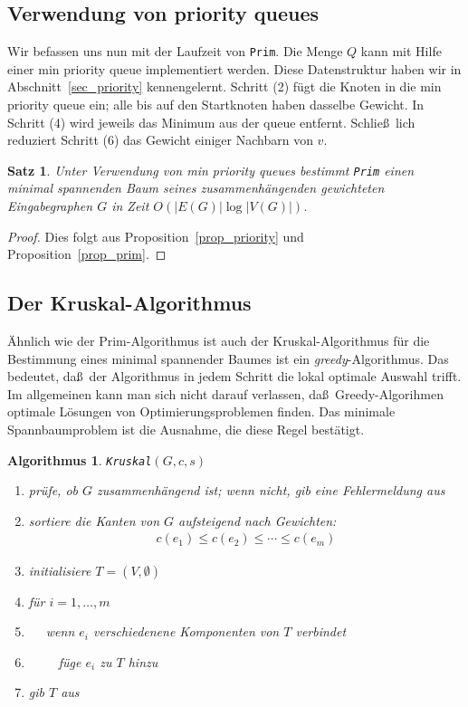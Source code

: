 \documentclass[10pt,reqno]{amsart}
\numberwithin{equation}{section}
\newtheorem{theorem}[definition]{Satz}
\newtheorem{algorithm}[definition]{Algorithmus}
\newcommand\Prop{Proposition}
\begin{document}
\subsection{Verwendung von priority queues}\label{sec_prim_priority}
Wir befassen uns nun mit der Laufzeit von {\tt Prim}.
Die Menge $Q$ kann mit Hilfe einer min priority queue implementiert werden.
Diese Datenstruktur haben wir in Abschnitt~\ref{sec_priority} kennengelernt.
Schritt (2) f\"ugt die Knoten in die min priority queue ein; alle bis auf den Startknoten haben dasselbe Gewicht.
In Schritt (4) wird jeweils das Minimum aus der queue entfernt.
Schlie\ss\ lich reduziert Schritt (6) das Gewicht einiger Nachbarn von $v$.

\begin{theorem}\label{thm_prim}
	Unter Verwendung von min priority queues bestimmt {\tt Prim} einen minimal spannenden Baum seines zusammenh\"angenden gewichteten Eingabegraphen $G$ in Zeit $O(|E(G)|\log|V(G)|)$.
\end{theorem}
\begin{proof}
	Dies folgt aus \Prop~\ref{prop_priority} und \Prop~\ref{prop_prim}.
\end{proof}

\subsection{Der Kruskal-Algorithmus}\label{sec_kruskal}
\"Ahnlich wie der Prim-Algorithmus ist auch der Kruskal-Algorithmus f\"ur die Bestimmung eines minimal spannender Baumes ist ein {\em greedy}-Algorithmus.
Das bedeutet, da\ss\ der Algorithmus in jedem Schritt die lokal optimale Auswahl trifft.
Im allgemeinen kann man sich nicht darauf verlassen, da\ss\ Greedy-Algorihmen optimale L\"osungen von Optimierungsproblemen finden.
Das minimale Spannbaumproblem ist die Ausnahme, die diese Regel best\"atigt.

\begin{algorithm}{\tt Kruskal}$(G,c,s)$
	\begin{enumerate}
		\item pr\"ufe, ob $G$ zusammenh\"angend ist; wenn nicht, gib eine Fehlermeldung aus
		\item sortiere die Kanten von $G$ aufsteigend nach Gewichten:
			\begin{align*}
				c(e_1)\leq c(e_2)\leq\cdots \leq c(e_m)
			\end{align*}
		\item initialisiere $T=(V,\emptyset)$
		\item f\"ur $i=1,\ldots,m$
		\item $\quad$ wenn $e_i$ verschiedenene Komponenten von $T$ verbindet
		\item $\quad\quad$ f\"uge $e_i$ zu $T$ hinzu
		\item gib $T$ aus
	\end{enumerate}
\end{algorithm}
\end{document}
